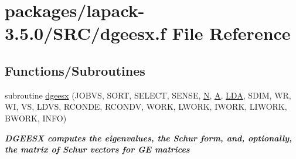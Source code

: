 \hypertarget{dgeesx_8f}{}\section{packages/lapack-\/3.5.0/\+S\+R\+C/dgeesx.f File Reference}
\label{dgeesx_8f}
\subsection*{Functions/\+Subroutines}
\begin{DoxyCompactItemize}
\item 
subroutine \hyperlink{group__doubleGEeigen_ga745081b04dc6f1b5a93a5d8b31aec915}{dgeesx} (J\+O\+B\+V\+S, S\+O\+R\+T, S\+E\+L\+E\+C\+T, S\+E\+N\+S\+E, \hyperlink{polmisc_8c_a0240ac851181b84ac374872dc5434ee4}{N}, \hyperlink{classA}{A}, \hyperlink{example__user_8c_ae946da542ce0db94dced19b2ecefd1aa}{L\+D\+A}, S\+D\+I\+M, W\+R, W\+I, V\+S, L\+D\+V\+S, R\+C\+O\+N\+D\+E, R\+C\+O\+N\+D\+V, W\+O\+R\+K, L\+W\+O\+R\+K, I\+W\+O\+R\+K, L\+I\+W\+O\+R\+K, B\+W\+O\+R\+K, I\+N\+F\+O)
\begin{DoxyCompactList}\small\item\em {\bfseries  D\+G\+E\+E\+S\+X computes the eigenvalues, the Schur form, and, optionally, the matrix of Schur vectors for G\+E matrices} \end{DoxyCompactList}\end{DoxyCompactItemize}
